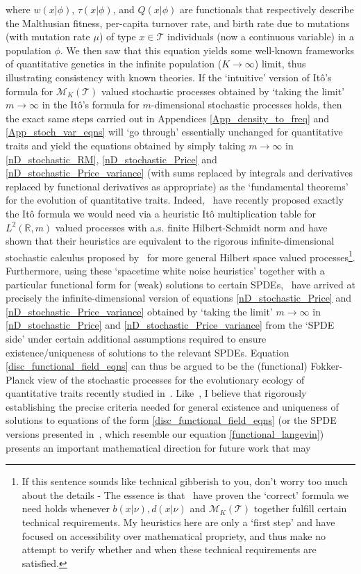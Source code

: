 where $w(x|\phi)$, $\tau(x|\phi)$, and $Q(x|\phi)$ are functionals that respectively describe the Malthusian fitness, per-capita turnover rate, and birth rate due to mutations (with mutation rate $\mu$) of type $x \in \mathcal{T}$ individuals (now a continuous variable) in a population $\phi$. We then saw that this equation yields some well-known frameworks of quantitative genetics in the infinite population ($K \to \infty$) limit, thus illustrating consistency with known theories. If the `intuitive' version of It\^{o}'s formula for $\mathcal{M}_K(\mathcal{T})$ valued stochastic processes obtained by `taking the limit' $m \to \infty$ in the It\^{o}'s formula for $m$-dimensional stochastic processes holds, then the exact same steps carried out in Appendices \ref{App_density_to_freq} and \ref{App_stoch_var_eqns} will `go through' essentially unchanged for quantitative traits and yield the equations obtained by simply taking $m \to \infty$ in \eqref{nD_stochastic_RM}, \eqref{nD_stochastic_Price} and \eqref{nD_stochastic_Price_variance} (with sums replaced by integrals and derivatives replaced by functional derivatives as appropriate) as the `fundamental theorems' for the evolution of quantitative traits. Indeed,~\cite{week_white_2021} have recently proposed exactly the It\^o formula we would need via a heuristic It\^o multiplication table for $L^2(\mathbb{R}, m)$ valued processes with a.s. finite Hilbert-Schmidt norm and have shown that their heuristics are equivalent to the rigorous infinite-dimensional stochastic calculus proposed by~\cite{da_prato_stochastic_2014} for more general Hilbert space valued processes\footnote{If this sentence sounds like technical gibberish to you, don't worry too much about the details - The essence is that~\cite{week_white_2021} have proven the `correct' formula we need holds whenever $b(x|\nu), d(x|\nu)$ and $\mathcal{M}_K(\mathcal{T})$ together fulfill certain technical requirements. My heuristics here are only a `first step' and have focused on accessibility over mathematical propriety, and thus make no attempt to verify whether and when these technical requirements are satisfied.}. Furthermore, using these `spacetime white noise heuristics' together with a particular functional form for (weak) solutions to certain SPDEs,~\cite{week_white_2021} have arrived at precisely the infinite-dimensional version of equations \eqref{nD_stochastic_Price} and \eqref{nD_stochastic_Price_variance} obtained by `taking the limit' $m \to \infty$ in \eqref{nD_stochastic_Price} and \eqref{nD_stochastic_Price_variance} from the `SPDE side' under certain additional assumptions required to ensure existence/uniqueness of solutions to the relevant SPDEs. Equation \eqref{disc_functional_field_eqns} can thus be argued to be the (functional) Fokker-Planck view of the stochastic processes for the evolutionary ecology of quantitative traits recently studied in~\cite{week_white_2021}. Like~\cite{week_white_2021}, I believe that rigorously establishing the precise criteria needed for general existence and uniqueness of solutions to equations of the form \eqref{disc_functional_field_eqns} (or the SPDE versions presented in~\cite{week_white_2021}, which resemble our equation \eqref{functional_langevin}) presents an important mathematical direction for future work that may 